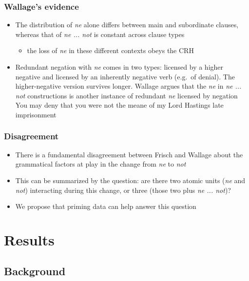 \documentclass{digs-slides}
\begin{document}
\begin{frame}
    \frametitle{Wallage’s evidence}
    \begin{itemize}
      \item The distribution of \emph{ne} alone differs between main and
        subordinate clauses, whereas that of \emph{ne ... not} is
        constant across clause types
        \begin{itemize}
          \item the loss of \emph{ne} in these different contexts obeys
            the CRH
        \end{itemize}
      \item Redundant negation with \emph{ne} comes in two types:
        licensed by a higher negative and licensed by an inherently
        negative verb (e.g.\ of denial).  The higher-negative version
        survives longer.  Wallage argues that the \emph{ne} in \emph{ne
            ... not} constructions is another instance of redundant
        \emph{ne} licensed by negation
        \pause
        \ex
        You may deny that you were \alert{not} the meane of my Lord Hastings
        late imprisonment
        \xe
    \end{itemize}
\end{frame}

\begin{frame}
    \frametitle{Disagreement}
    \begin{itemize}
      \item There is a fundamental disagreement between Frisch and
        Wallage about the grammatical factors at play in the change from
        \emph{ne} to \emph{not}
      \item This can be summarized by the question: are there two atomic
        units (\emph{ne} and \emph{not}) interacting during this change,
        or three (those two plus \emph{ne ... not})?
      \item We propose that priming data can help answer this question
    \end{itemize}
\end{frame}

\section{Results}

\subsection{Background}
\end{document}
